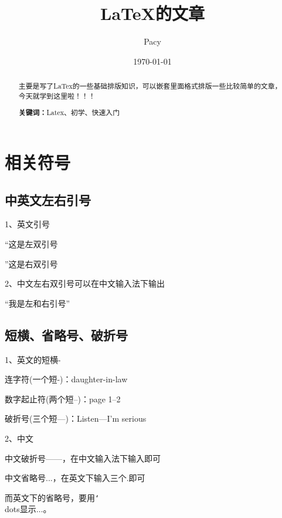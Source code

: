 \documentclass[10pt,UTF8]{ctexart}     %
\title{LaTeX的文章}
\author{Pacy}
\date{\today}
\begin{document}
	\maketitle  %
	\setcounter{page}{0}   %
	\thispagestyle{empty}  %
	\maketitle  %
	\begin{abstract}
		主要是写了LaTex的一些基础排版知识，可以嵌套里面格式排版一些比较简单的文章，今天就学到这里啦！！！ \par  %
		\textbf{关键词：}Latex、初学、快速入门   %
	\end{abstract}
	\newpage
	\tableofcontents
	\setcounter{page}{1}  %
	\newpage
	\setcounter{page}{1}  %
	\section{相关符号}
	\subsection{中英文左右引号}
	1、英文引号\par
	``这是左双引号  \par %
	''这是右双引号 \par  %
	2、中文左右双引号可以在中文输入法下输出 \par
	“我是左和右引号”  \par
	\subsection{短横、省略号、破折号}
	1、英文的短横-   \par
	连字符(一个短-)：daughter-in-law \par
	数字起止符(两个短--)：page 1--2  \par
	破折号(三个短---)：Listen---I'm serious \par
	2、中文  \par
	中文破折号——，在中文输入法下输入即可\par
	中文省略号...，在英文下输入三个.即可\par
	而英文下的省略号，要用\texttt{\char`\\}dots显示$\dots$。\par  %
	
\end{document}
